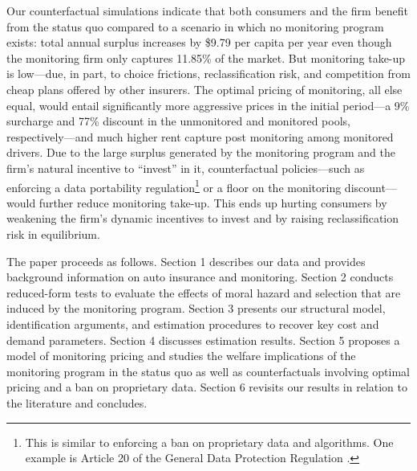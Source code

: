 Our counterfactual simulations indicate that both consumers and the firm benefit from the status quo compared to a scenario in which no monitoring program exists: total annual surplus increases by \$9.79 per capita per year even though the monitoring firm only captures 11.85\% of the market.
But monitoring take-up is low---due, in part, to choice frictions, reclassification risk, and competition from cheap plans offered by other insurers. The optimal pricing of monitoring, all else equal, would entail significantly more aggressive prices in the initial period---a 9\% surcharge and 77\% discount in the unmonitored and monitored pools, respectively---and much higher rent capture post monitoring among monitored drivers.
Due to the large surplus generated by the monitoring program and the firm's natural incentive to ``invest'' in it, counterfactual policies---such as enforcing a data portability regulation\footnote{This is similar to enforcing a ban on proprietary data and algorithms. One example is Article 20 of the General Data Protection Regulation \parencite{de2018right}.} or a floor on the monitoring discount---would further reduce monitoring take-up. This ends up hurting consumers by weakening the firm's dynamic incentives to invest and by raising reclassification risk in equilibrium.

The paper proceeds as follows. Section 1 describes our data and provides background information on auto insurance and monitoring. Section 2 conducts reduced-form tests to evaluate the effects of moral hazard and selection that are induced by the monitoring program. Section 3 presents our structural model, identification arguments, and estimation procedures to recover key cost and demand parameters. Section 4 discusses estimation results. Section 5 proposes a model of monitoring pricing and studies the welfare implications of the monitoring program in the status quo as well as counterfactuals involving optimal pricing and a ban on proprietary data. Section 6 revisits our results in relation to the literature and concludes.

